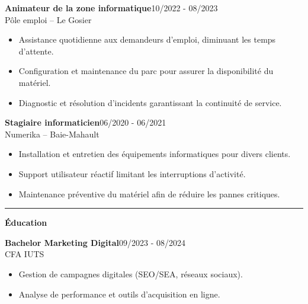 \documentclass[a4paper]{article}
\renewcommand{\colorbox}[2]{#2}%
\newcommand{\fullrule}{\hspace{-1.5cm}\rule{\paperwidth}{0.4pt}}
\newcommand{\cvsection}[1]{%
  \vspace{6pt}\textbf{\Large #1}\par\vspace{2pt}}
\begin{document}
\vspace{3mm}

\colorbox{maincolor}{%
  \begin{minipage}{\linewidth}
    \noindent
    \textbf{Animateur de la zone informatique}\hfill 10/2022 - 08/2023\\
    Pôle emploi – Le Gosier\\[-0.3em]
    \begin{itemize}[leftmargin=*]
      \item Assistance quotidienne aux demandeurs d’emploi, diminuant les temps d’attente. \item Configuration et maintenance du parc pour assurer la disponibilité du matériel. \item Diagnostic et résolution d’incidents garantissant la continuité de service.
    \end{itemize}
  \end{minipage}}

\vspace{3mm}

\colorbox{maincolor}{%
  \begin{minipage}{\linewidth}
    \noindent
    \textbf{Stagiaire informaticien}\hfill 06/2020 - 06/2021\\
    Numerika – Baie-Mahault\\[-0.3em]
    \begin{itemize}[leftmargin=*]
      \item Installation et entretien des équipements informatiques pour divers clients. \item Support utilisateur réactif limitant les interruptions d’activité. \item Maintenance préventive du matériel afin de réduire les pannes critiques.
    \end{itemize}
  \end{minipage}}

\medskip\fullrule

\cvsection{Éducation}
\hspace*{1.3cm}%
\colorbox{maincolor}{%
  \begin{minipage}{\linewidth}
    \noindent
    \textbf{Bachelor Marketing Digital}\hfill 09/2023 - 08/2024\\
    CFA IUTS\\[-0.3em]
    \begin{itemize}[leftmargin=*]
      \item Gestion de campagnes digitales (SEO/SEA, réseaux sociaux). \item Analyse de performance et outils d’acquisition en ligne.
    \end{itemize}
  \end{minipage}}
\end{document}
